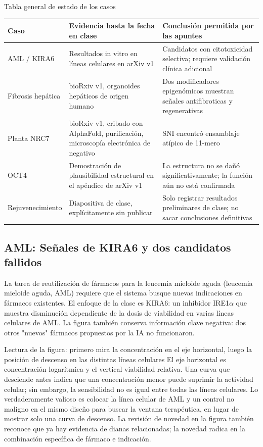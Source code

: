 \begin{importantbox}{Tabla general de estado de los casos}
\begin{tabularx}{\textwidth}{L{0.20\textwidth}X X}
\toprule
Caso & Evidencia hasta la fecha en clase & Conclusión permitida por las apuntes \\
\midrule
AML / KIRA6 & Resultados in vitro en líneas celulares en arXiv v1 & Candidatos con citotoxicidad selectiva; requiere validación clínica adicional \\
Fibrosis hepática & bioRxiv v1, organoides hepáticos de origen humano & Dos modificadores epigenómicos muestran señales antifibroticas y regenerativas \\
Planta NRC7 & bioRxiv v1, cribado con AlphaFold, purificación, microscopía electrónica de negativo & SNI encontró ensamblaje atípico de 11-mero \\
OCT4 & Demostración de plausibilidad estructural en el apéndice de arXiv v1 & La estructura no se dañó significativamente; la función aún no está confirmada \\
Rejuvenecimiento & Diapositiva de clase, explícitamente sin publicar & Solo registrar resultados preliminares de clase; no sacar conclusiones definitivas \\
\bottomrule
\end{tabularx}
\end{importantbox}

\subsection{AML: Señales de KIRA6 y dos candidatos fallidos}

La tarea de reutilización de fármacos para la leucemia mieloide aguda (leucemia mieloide aguda, AML) requiere que el sistema busque nuevas indicaciones en fármacos existentes. El enfoque de la clase es KIRA6: un inhibidor IRE1$\alpha$ que muestra disminución dependiente de la dosis de viabilidad en varias líneas celulares de AML. La figura también conserva información clave negativa: dos otros "nuevos" fármacos propuestos por la IA no funcionaron.


\begin{knowledgebox}{Lectura de la figura: primero mira la concentración en el eje horizontal, luego la posición de descenso en las distintas líneas celulares}
El eje horizontal es concentración logarítmica y el vertical viabilidad relativa. Una curva que desciende antes indica que una concentración menor puede suprimir la actividad celular; sin embargo, la sensibilidad no es igual entre todas las líneas celulares. Lo verdaderamente valioso es colocar la línea celular de AML y un control no maligno en el mismo diseño para buscar la ventana terapéutica, en lugar de mostrar solo una curva de descenso. La revisión de novedad en la figura también reconoce que ya hay evidencia de dianas relacionadas; la novedad radica en la combinación específica de fármaco e indicación.
\end{knowledgebox}

